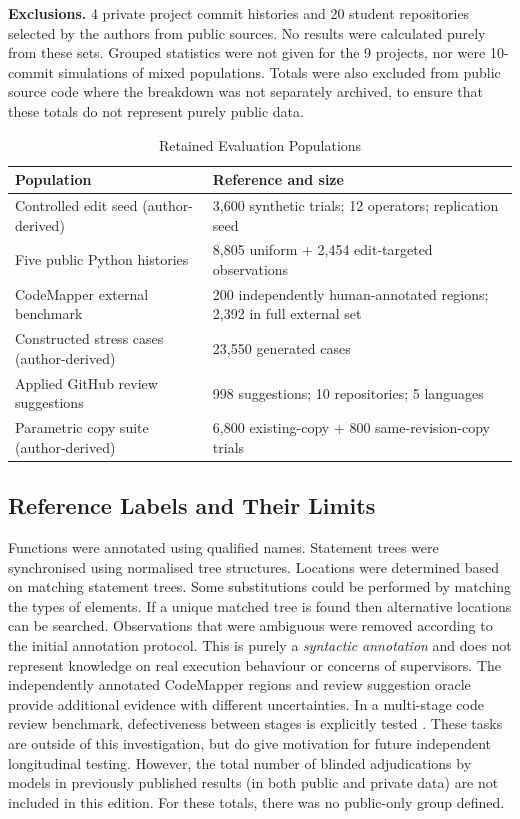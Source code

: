 \documentclass[10pt,conference,letterpaper]{IEEEtran}
\begin{document}
\textbf{Exclusions.} 4 private project commit histories and 20 student repositories selected by the authors from public sources. No results were calculated purely from these sets. Grouped statistics were not given for the 9 projects, nor were 10-commit simulations of mixed populations. Totals were also excluded from public source code where the breakdown was not separately archived, to ensure that these totals do not represent purely public data.

\begin{table}[!t]
\caption{Retained Evaluation Populations}
\label{tab:populations}
\centering\footnotesize\setlength{\tabcolsep}{3.4pt}
\begin{tabularx}{\columnwidth}{>{\raggedright\arraybackslash}p{}X}
\hline
Population & Reference and size \\
\hline
Controlled edit seed (author-derived) & 3,600 synthetic trials; 12 operators; replication seed \\
Five public Python histories & 8,805 uniform + 2,454 edit-targeted observations \\
CodeMapper external benchmark & 200 independently human-annotated regions; 2,392 in full external set \\
Constructed stress cases (author-derived) & 23,550 generated cases \\
Applied GitHub review suggestions & 998 suggestions; 10 repositories; 5 languages \\
Parametric copy suite (author-derived) & 6,800 existing-copy + 800 same-revision-copy trials \\
\hline
\end{tabularx}
\end{table}

\subsection{Reference Labels and Their Limits}
Functions were annotated using qualified names. Statement trees were synchronised using normalised tree structures. Locations were determined based on matching statement trees. Some substitutions could be performed by matching the types of elements. If a unique matched tree is found then alternative locations can be searched. Observations that were ambiguous were removed according to the initial annotation protocol. This is purely a \emph{syntactic annotation} and does not represent knowledge on real execution behaviour or concerns of supervisors. The independently annotated CodeMapper regions and review suggestion oracle provide additional evidence with different uncertainties. In a multi-stage code review benchmark, defectiveness between stages is explicitly tested \cite{mcrbench2026}. These tasks are outside of this investigation, but do give motivation for future independent longitudinal testing. However, the total number of blinded adjudications by models in previously published results (in both public and private data) are not included in this edition. For these totals, there was no public-only group defined.
\end{document}
